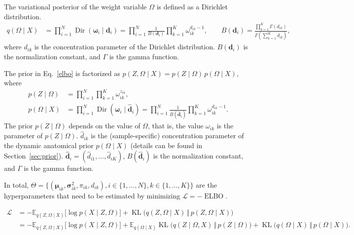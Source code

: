 \documentclass[preprint,12pt]{elsarticle}
\begin{document}
The variational posterior of the weight variable $\Omega$ is defined as a Dirichlet distribution. 
\begin{equation}
\label{Omega_posterior}
\begin{split}
  q(\Omega\mid X) &= \prod_{i=1}^N \operatorname{Dir}(\boldsymbol{\omega}_i\mid \boldsymbol{d}_i)
  = \prod_{i=1}^N \frac{1}{B(\boldsymbol{d}_i)}\prod_{k=1}^K \omega_{ik}^{d_{ik}-1},\qquad
  B(\boldsymbol{d}_{i})
=
\frac{\prod_{k=1}^K \Gamma(d_{ik})}
{\Gamma\left(\sum_{k=1}^K d_{ik}\right)},
\end{split}
\end{equation}
where $d_{ik}$ is the concentration parameter of the Dirichlet distribution. $B(\boldsymbol{d}_{i})$ is the normalization constant, and $\Gamma$ is the gamma function. 


The prior in Eq.~\eqref{elbo} is factorized as $p(Z,\Omega\mid X)=p(Z\mid\Omega)\,p(\Omega\mid X)$, where
\begin{equation}
\label{prior}
\begin{split}
  p(Z\mid\Omega) &= \prod_{i=1}^N\prod_{k=1}^K \omega_{ik}^{z_{ik}},\\
  p(\Omega\mid X) &= \prod_{i=1}^N \operatorname{Dir}(\boldsymbol{\omega}_i\mid \boldsymbol{\hat{d}}_i)
  = \prod_{i=1}^N \frac{1}{B(\boldsymbol{\hat{d}}_i)}\prod_{k=1}^K \omega_{ik}^{\hat{d}_{ik}-1}.
  \end{split}
\end{equation}
The prior $p(Z\mid \Omega)$ depends on the value of $\Omega$, that is, the value $\omega_{ik}$ is the parameter of $p(Z\mid \Omega)$. 
$\hat{d}_{ik}$ is the (sample-specific) concentration parameter of the dynamic anatomical prior $p(\Omega\mid X)$ (details can be found in Section~\ref{sec:prior}). $\boldsymbol{\hat{d}}_i=(\hat{d}_{i1},\dots,\hat{d}_{iK})$, $B(\boldsymbol{\hat{d}}_i)$ is the normalization constant, and $\Gamma$ is the gamma function.


%
In total, $\Theta=\{ (\boldsymbol{\mu}_{ik}, \boldsymbol{\sigma}^2_{ik}, \pi_{ik}, d_{ik}), i\in\{1,\dots,N\}, k\in\{1,\dots,K\}\}$ are the hyperparameters that need to be estimated by minimizing $\mathcal{L}=-\operatorname{ELBO}$. 

\begin{equation}
\label{loss}
\begin{split}
  \mathcal{L}  &= -\mathbb{E}_{q(Z,\Omega\mid X)}\big[\log p(X\mid Z, \Omega)\big]
  + \operatorname{KL}\big(q(Z,\Omega\mid X)\,\Vert\,p(Z,\Omega\mid X)\big)\\
  &= -\mathbb{E}_{q(Z,\Omega\mid X)}\big[\log p(X\mid Z, \Omega)\big]
  + \mathbb{E}_{q(\Omega\mid X)}\operatorname{KL}\big(q(Z\mid \Omega, X)\,\Vert\,p(Z\mid\Omega)\big)+ \operatorname{KL}\big(q(\Omega\mid X)\,\Vert\,p(\Omega\mid X)\big).\\
\end{split}
\end{equation}
\end{document}
